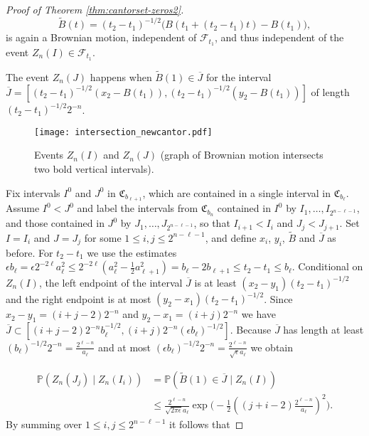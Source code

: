 \documentclass[11pt,reqno]{amsart}
\theoremstyle{plain}
\theoremstyle{definition}
\theoremstyle{remark}
\begin{document}
\begin{proof}[Proof of Theorem \ref{thm:cantorset-zeros2}]
\[\widetilde{B}(t)=(t_2-t_1)^{-1/2}\Big(B(t_1+(t_2-t_1) t)-B(t_1)\Big),\]
is again a Brownian motion, independent of $\mathcal{F}_{t_1}$, and thus independent of the event $Z_n(I) \in \mathcal{F}_{t_1}$.

The event $Z_n(J)$ happens when $\widetilde{B}(1) \in \overline{J}$ for the interval $\overline{J}=[(t_2-t_1)^{-1/2}(x_2-B(t_1)) , (t_2-t_1)^{-1/2}(y_2-B(t_1))]$ of length $(t_2-t_1)^{-1/2}2^{-n}$.

\begin{figure}

\texttt{[image: intersection\_newcantor.pdf]}

\caption{Events $Z_n(I)$ and $Z_n(J)$ (graph of Brownian motion intersects two bold vertical intervals).}

\label{fig:intersection_with_cantorII}

\end{figure}

Fix intervals $I^0$ and $J^0$ in $\mathfrak{C}_{b_{\ell+1}}$, which are contained in a single interval in $\mathfrak{C}_{b_{\ell}}$. Assume $I^0 < J^0$ and label the intervals from $\mathfrak{C}_{b_n}$ contained in $I^0$ by $I_1, \dots, I_{2^{n-\ell-1}}$, and those contained in $J^0$ by $J_1, \dots, J_{2^{n-\ell-1}}$, so that $I_{i+1} < I_i$ and $J_j < J_{j+1}$. Set $I=I_i$ and $J=J_j$ for some $1 \leq i,j \leq 2^{n-\ell-1}$, and define $x_i$, $y_i$, $\widetilde{B}$ and $\overline{J}$ as before.
For $t_2-t_1$ we use the estimates $\epsilon b_\ell = \epsilon  2^{-2\ell}  a_\ell^2 \leq 2^{-2\ell}(a_\ell^2 - \frac{1}{2}a_{\ell+1}^2) = b_\ell - 2b_{\ell+1} \leq t_2-t_1 \leq b_\ell$. Conditional on $Z_n(I)$, the left endpoint of the interval $\overline{J}$ is at least $(x_2-y_1)(t_2-t_1)^{-1/2}$ and the right endpoint is at most $(y_2-x_1)(t_2-t_1)^{-1/2}$. Since $x_2-y_1 = (i+j-2)2^{-n}$ and $y_2-x_1 = (i+j)2^{-n}$ we have $\overline{J} \subset [(i+j-2)2^{-n}b_\ell^{-1/2}, (i+j)2^{-n}(\epsilon b_\ell)^{-1/2}]$. Because $\overline{J}$ has length at least $(b_\ell)^{-1/2}2^{-n} = \frac{2^{\ell-n}}{a_\ell}$ and at most $(\epsilon b_\ell)^{-1/2}2^{-n}= \frac{2^{\ell-n}}{\sqrt{\epsilon}a_\ell}$ we obtain

\begin{align*}
\mathbb{P}(Z_n(J_j) \mid Z_n(I_i)) &  = \mathbb{P}(\widetilde{B}(1) \in \overline{J} \mid Z_n(I))\\
& \leq \frac{2^{\ell-n}}{\sqrt{2\pi\epsilon}a_\ell}\exp\Big(-\frac{1}{2} {((j+i-2)\frac{2^{\ell-n}}{a_\ell})^2}\Big).
\end{align*}
By summing over $1 \leq i,j \leq 2^{n-\ell-1}$ it follows that


\end{proof}
\end{document}
